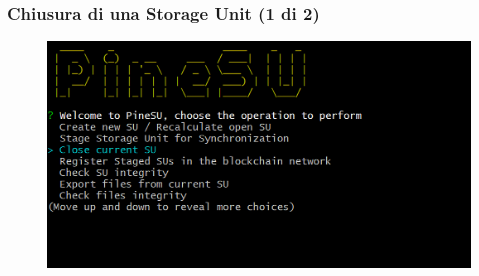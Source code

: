 \documentclass{beamer}
\begin{document}
\begin{frame}
	\frametitle{Chiusura di una Storage Unit (1 di 2)}
	\begin{figure}
		\includegraphics[width=\textwidth]{figures/ops/3.png}
	\end{figure}
\end{frame}
\end{document}
